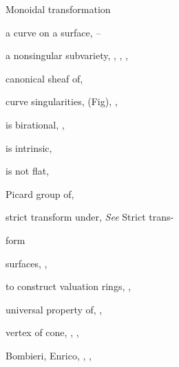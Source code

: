 {{\noindent\hspace*{15.0bp}Monoidal transformation\par
\noindent\hspace*{7.5bp}a curve on a surface, --\par
\noindent\hspace*{7.5bp}a nonsingular subvariety, , , ,\par
\noindent\hspace*{15.0bp}\par
\noindent\hspace*{7.5bp}canonical sheaf of, \par
\noindent\hspace*{7.5bp}curve singularities,  (Fig), , \par
\noindent\hspace*{7.5bp}is birational, , \par
\noindent\hspace*{7.5bp}is intrinsic, \par
\noindent\hspace*{7.5bp}is not flat, \par
\noindent\hspace*{7.5bp}Picard group of, \par
\noindent\hspace*{7.5bp}strict transform under, \emph{See} Strict trans-\par
\noindent\hspace*{15.0bp}form\par
\noindent\hspace*{7.5bp}surfaces, , \par
\noindent\hspace*{7.5bp}to construct valuation rings, , \par
\noindent\hspace*{7.5bp}universal property of, , \par
\noindent\hspace*{7.5bp}vertex of cone, , , \par
\noindent\hspace*{0.0bp}Bombieri, Enrico, , , \par
}}
